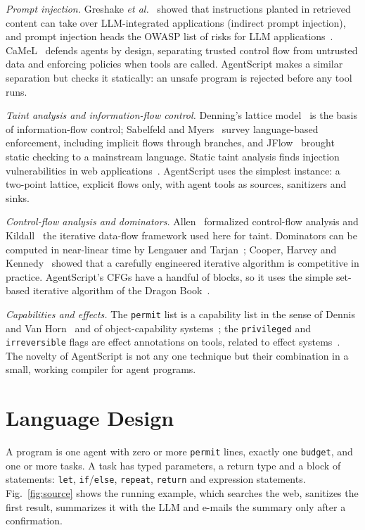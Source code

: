 \documentclass[conference]{IEEEtran}
\begin{document}
\emph{Prompt injection.} Greshake \emph{et al.}~\cite{greshake} showed that instructions planted in retrieved content can take over LLM-integrated applications (indirect prompt injection), and prompt injection heads the OWASP list of risks for LLM applications~\cite{owasp}. CaMeL~\cite{camel} defends agents by design, separating trusted control flow from untrusted data and enforcing policies when tools are called. AgentScript makes a similar separation but checks it statically: an unsafe program is rejected before any tool runs.

\emph{Taint analysis and information-flow control.} Denning's lattice model~\cite{denning} is the basis of information-flow control; Sabelfeld and Myers~\cite{sabelfeld} survey language-based enforcement, including implicit flows through branches, and JFlow~\cite{jflow} brought static checking to a mainstream language. Static taint analysis finds injection vulnerabilities in web applications~\cite{livshits}. AgentScript uses the simplest instance: a two-point lattice, explicit flows only, with agent tools as sources, sanitizers and sinks.

\emph{Control-flow analysis and dominators.} Allen~\cite{allen} formalized control-flow analysis and Kildall~\cite{kildall} the iterative data-flow framework used here for taint. Dominators can be computed in near-linear time by Lengauer and Tarjan~\cite{lt}; Cooper, Harvey and Kennedy~\cite{cooper} showed that a carefully engineered iterative algorithm is competitive in practice. AgentScript's CFGs have a handful of blocks, so it uses the simple set-based iterative algorithm of the Dragon Book~\cite{aho}.

\emph{Capabilities and effects.} The \texttt{permit} list is a capability list in the sense of Dennis and Van Horn~\cite{dennis} and of object-capability systems~\cite{miller}; the \texttt{privileged} and \texttt{irreversible} flags are effect annotations on tools, related to effect systems~\cite{lucassen}. The novelty of AgentScript is not any one technique but their combination in a small, working compiler for agent programs.

\section{Language Design}
A program is one agent with zero or more \texttt{permit} lines, exactly one \texttt{budget}, and one or more tasks. A task has typed parameters, a return type and a block of statements: \texttt{let}, \texttt{if}/\texttt{else}, \texttt{repeat}, \texttt{return} and expression statements. Fig.~\ref{fig:source} shows the running example, which searches the web, sanitizes the first result, summarizes it with the LLM and e-mails the summary only after a confirmation.
\end{document}
